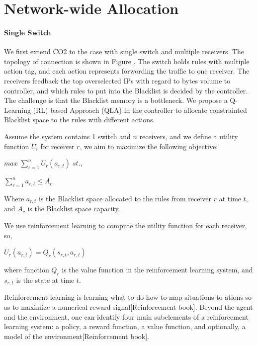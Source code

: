 % 
% 
% 
% 

\section{Network-wide Allocation}
\paragraph{Single Switch}
  We first extend CO2 to the case with single switch and multiple receivers. The topology of connection is shown in Figure {}. The switch holds rules with multiple action tag, and each action represents forwording the traffic to one receiver. The receivers feedback the top overselected IPs with regard to bytes volume to controller, and which rules to put into the Blacklist is decided by the controller. The challenge is that the Blacklist memory is a bottleneck. We propose a Q-Learning (RL) based Approach (QLA) in the controller to allocate constrainted Blacklist space to the rules with different actions.

    

  Assume the system contains 1 switch and $n$ receivers, and we define a utility function $U_i$ for receiver $r$, we aim to maximize the following objective: %
  
  $max \; \sum_{r = 1}^{n} U_r(a_{r,t})\;st.,$
  
  $\sum_{r = 1}^{n}a_{r,t} \leq A_c$
  
  Where $a_{r,t}$ is the Blacklist space allocated to the rules from receiver $r$ at time $t$, and $A_c$ is the Blacklist space capacity.
  
  We use reinforcement learning to compute the utility function for each receiver, so,
  
  $U_r(a_{r,t}) = Q_r(s_{r,t}, a_{r,t})$
  
  where function $Q_r$ is the value function in the reinforcement learning system, and $s_{r,t}$ is the state at time $t$.
  
  Reinforcement learning is learning what to do-how to map situations to ations-so as to maximize a numerical reward signal[Reinforcement book]. Beyond the agent and the environment, one can identify four main subelements of a reinforcement learning system: a policy, a reward function, a value function, and optionally, a model of the environment[Reinforcement book]. 
  
